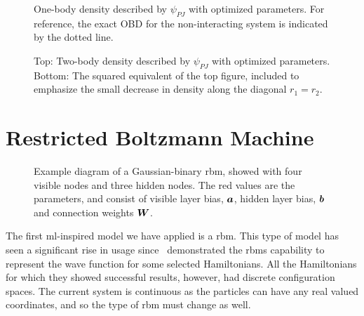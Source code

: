 \documentclass[Thesis.tex]{subfiles}
\begin{document}
\begin{figure}[h]
   \centering
    \resizebox{0.7\linewidth}{!}{%
        
    }
    \caption[One-body density using Pade-Jastrow wave function]{\label{fig:QD-benchmark-pade-jastrow-onebody}One-body density
      described by $\psi_{PJ}$ with optimized parameters. For reference, the
      exact OBD for the non-interacting system is indicated by the dotted line.}
\end{figure}

\begin{figure}[h]
   \centering
    \resizebox{0.7\linewidth}{!}{%
        
    }
    \resizebox{0.7\linewidth}{!}{%
        
    }
    \caption[Two-body density using Pade-Jastrow wave function]{\label{fig:QD-benchmark-pade-jastrow-density}Top: Two-body density
      described by $\psi_{PJ}$ with optimized parameters. Bottom: The squared
      equivalent of the top figure, included to emphasize the small decrease in
      density along the diagonal $r_1=r_2$.}
\end{figure}

\clearpage


\section{Restricted Boltzmann Machine}

\begin{figure}[h]
  \centering
  
  \caption[Illustration of a \acrfull{rbm}]{Example diagram of a Gaussian-binary \acrlong{rbm}, showed with four visible nodes
    and three hidden nodes. The red values are the parameters, and consist of
    visible layer bias, $\bm{a}$, hidden layer bias, $\bm{b}$ and connection
    weights $\bm{W}$.}
  \label{fig:rbm-diagram-example}
\end{figure}


The first \gls{ml}-inspired model we have applied is a \acrfull{rbm}.
This type of model has seen a significant rise in usage
since~\textcite{Carleo602} demonstrated the \glspl{rbm} capability to
represent the wave function for some selected Hamiltonians. All the
Hamiltonians for which they showed successful results, however, had discrete
configuration spaces. The current system is continuous as the particles can have
any real valued coordinates, and so the type of \gls{rbm} must change as well.
\end{document}
